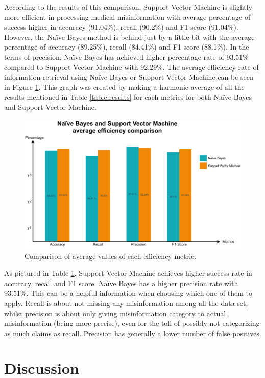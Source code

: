 \documentclass[11pt ,english,a4paper]{article}
\begin{document}
According to the results of this comparison, Support Vector Machine is slightly more efficient in processing medical misinformation with average percentage of success higher in accuracy (91.04\%), recall (90.2\%) and F1 score (91.04\%). However, the Naïve Bayes method is behind just by a little bit with the average percentage of accuracy (89.25\%), recall (84.41\%) and F1 score (88.1\%). In the terms of precision, Naïve Bayes has achieved higher percentage rate of 93.51\% compared to Support Vector Machine with 92.29\%. The average efficiency rate of information retrieval using Naïve Bayes or Support Vector Machine can be seen in Figure \ref{f:average}. This graph was created by making a harmonic average of all the results mentioned in Table \ref{table:results} for each metrics for both Naïve Bayes and Support Vector Machine.

\begin{figure}[H]
\centering
\includegraphics[scale=0.5]{average.pdf}
\caption{\centering Comparison of average values of each efficiency metric.}
\label{f:average}
\end{figure}

As pictured in Table \ref{f:average}, Support Vector Machine achieves higher success rate in accuracy, recall and F1 score. Naïve Bayes has a higher precision rate with 93.51\%. This can be a helpful information when choosing which one of them to apply. Recall is about not missing any misinformation among all the data-set, whilst precision is about only giving misinformation category to actual misinformation (being more precise), even for the toll of possibly not categorizing as much claims as recall. Precision has generally a lower number of false positives. 

\section{Discussion}
\end{document}
